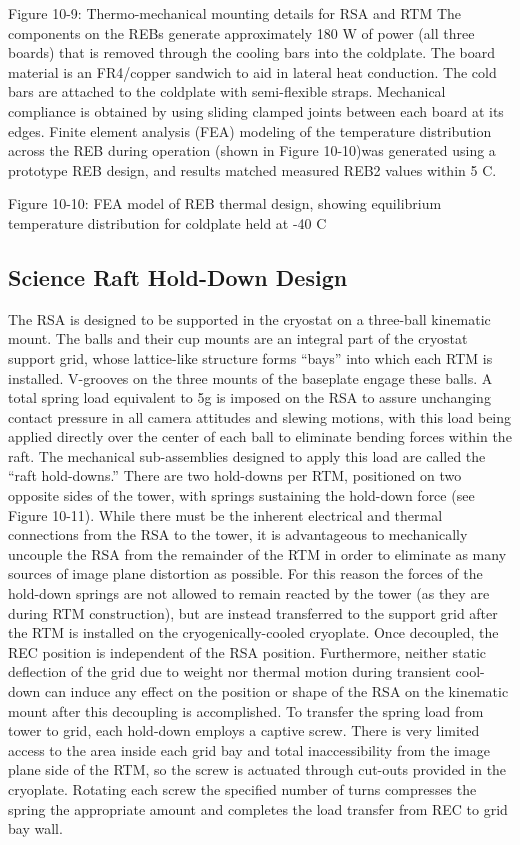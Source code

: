  
Figure 10-9: Thermo-mechanical mounting details for RSA and RTM
The components on the REBs generate approximately 180 W of power (all three boards) that is removed through the cooling bars into the coldplate. The board material is an FR4/copper sandwich to aid in lateral heat conduction. The cold bars are attached to the coldplate with semi-flexible straps. Mechanical compliance is obtained by using sliding clamped joints between each board at its edges. 
Finite element analysis (FEA) modeling of the temperature distribution across the REB during operation (shown in Figure 10-10)was generated using a prototype REB design, and results matched measured REB2 values within 5 C. 
 
Figure 10-10: FEA model of REB thermal design, showing equilibrium temperature distribution for coldplate held at -40 C

\subsection{Science Raft Hold-Down Design}
The RSA is designed to be supported in the cryostat on a three-ball kinematic mount. The balls and their cup mounts are an integral part of the cryostat support grid, whose lattice-like structure forms “bays” into which each RTM is installed. V-grooves on the three mounts of the baseplate engage these balls. A total spring load equivalent to 5g is imposed on the RSA to assure unchanging contact pressure in all camera attitudes and slewing motions, with this load being applied directly over the center of each ball to eliminate bending forces within the raft. The mechanical sub-assemblies designed to apply this load are called the “raft hold-downs.” There are two hold-downs per RTM, positioned on two opposite sides of the tower, with springs sustaining the hold-down force (see Figure 10-11).
While there must be the inherent electrical and thermal connections from the RSA to the tower, it is advantageous to mechanically uncouple the RSA from the remainder of the RTM in order to eliminate as many sources of image plane distortion as possible. For this reason the forces of the hold-down springs are not allowed to remain reacted by the tower (as they are during RTM construction), but are instead transferred to the support grid after the RTM is installed on the cryogenically-cooled cryoplate. Once decoupled, the REC position is independent of the RSA position. Furthermore, neither static deflection of the grid due to weight nor thermal motion during transient cool-down can induce any effect on the position or shape of the RSA on the kinematic mount after this decoupling is accomplished.
To transfer the spring load from tower to grid, each hold-down employs a captive screw. There is very limited access to the area inside each grid bay and total inaccessibility from the image plane side of the RTM, so the screw is actuated through cut-outs provided in the cryoplate. Rotating each screw the specified number of turns compresses the spring the appropriate amount and completes the load transfer from REC to grid bay wall. 
 
